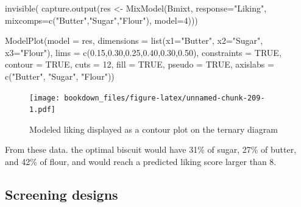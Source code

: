 \documentclass[
]{krantz}
\makeatletter
\newenvironment{Shaded}{\begin{snugshade}}{\end{snugshade}}
\newcommand{\AttributeTok}[1]{\textcolor[rgb]{0.61,0.61,0.61}{#1}}
\newcommand{\ConstantTok}[1]{\textcolor[rgb]{0,0,0}{#1}}
\newcommand{\DecValTok}[1]{\textcolor[rgb]{0.06,0.06,0.06}{#1}}
\newcommand{\FloatTok}[1]{\textcolor[rgb]{0.06,0.06,0.06}{#1}}
\newcommand{\FunctionTok}[1]{\textcolor[rgb]{0,0,0}{#1}}
\newcommand{\NormalTok}[1]{#1}
\newcommand{\OtherTok}[1]{\textcolor[rgb]{0.37,0.37,0.37}{#1}}
\newcommand{\StringTok}[1]{\textcolor[rgb]{0.5,0.5,0.5}{#1}}
\newenvironment{kframe}{%
\medskip{}
\setlength{\fboxsep}{.8em}
 \def\at@end@of@kframe{}%
 \ifinner\ifhmode%
  \def\at@end@of@kframe{\end{minipage}}%
  \begin{minipage}{\columnwidth}%
 \fi\fi%
 \def\FrameCommand##1{\hskip\@totalleftmargin \hskip-\fboxsep
 \colorbox{shadecolor}{##1}\hskip-\fboxsep
     \hskip-\linewidth \hskip-\@totalleftmargin \hskip\columnwidth}%
 \MakeFramed {\advance\hsize-\width
   \@totalleftmargin\z@ \linewidth\hsize
   \@setminipage}}%
 {\par\unskip\endMakeFramed%
 \at@end@of@kframe}
\renewenvironment{Shaded}{\begin{kframe}}{\end{kframe}}
\makeatother
\begin{document}
\begin{Shaded}
\begin{Highlighting}[]
\FunctionTok{invisible}\NormalTok{(}
  \FunctionTok{capture.output}\NormalTok{(res }\OtherTok{\textless{}{-}} \FunctionTok{MixModel}\NormalTok{(Bmixt, }\AttributeTok{response=}\StringTok{"Liking"}\NormalTok{, }
                                 \AttributeTok{mixcomps=}\FunctionTok{c}\NormalTok{(}\StringTok{"Butter"}\NormalTok{,}\StringTok{"Sugar"}\NormalTok{,}\StringTok{"Flour"}\NormalTok{), }
                                 \AttributeTok{model=}\DecValTok{4}\NormalTok{)))}

\FunctionTok{ModelPlot}\NormalTok{(}\AttributeTok{model =}\NormalTok{ res,}
          \AttributeTok{dimensions =} \FunctionTok{list}\NormalTok{(}\AttributeTok{x1=}\StringTok{"Butter"}\NormalTok{, }\AttributeTok{x2=}\StringTok{"Sugar"}\NormalTok{, }\AttributeTok{x3=}\StringTok{"Flour"}\NormalTok{),}
          \AttributeTok{lims =} \FunctionTok{c}\NormalTok{(}\FloatTok{0.15}\NormalTok{,}\FloatTok{0.30}\NormalTok{,}\FloatTok{0.25}\NormalTok{,}\FloatTok{0.40}\NormalTok{,}\FloatTok{0.30}\NormalTok{,}\FloatTok{0.50}\NormalTok{), }\AttributeTok{constraints =} \ConstantTok{TRUE}\NormalTok{,}
          \AttributeTok{contour =} \ConstantTok{TRUE}\NormalTok{, }\AttributeTok{cuts =} \DecValTok{12}\NormalTok{, }\AttributeTok{fill =} \ConstantTok{TRUE}\NormalTok{, }\AttributeTok{pseudo =} \ConstantTok{TRUE}\NormalTok{,}
          \AttributeTok{axislabs =} \FunctionTok{c}\NormalTok{(}\StringTok{"Butter"}\NormalTok{, }\StringTok{"Sugar"}\NormalTok{, }\StringTok{"Flour"}\NormalTok{))}
\end{Highlighting}
\end{Shaded}

\begin{figure}
\centering
\texttt{[image: bookdown\_files/figure-latex/unnamed-chunk-209-1.pdf]}
\caption{\label{fig:unnamed-chunk-209}Modeled liking displayed as a contour plot on the ternary diagram}
\end{figure}

From these data. the optimal biscuit would have 31\% of sugar, 27\% of butter, and 42\% of flour, and would reach a predicted liking score larger than 8.

\hypertarget{screening-designs}{%
\subsection{Screening designs}\label{screening-designs}}
\end{document}
